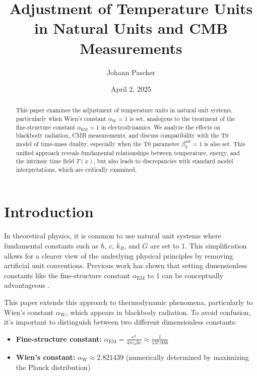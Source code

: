 \documentclass[12pt,a4paper]{article}
\newcommand{\Tfield}{T(x)}
\newcommand{\betaT}{\beta_{\text{T}}}
\newcommand{\alphaEM}{\alpha_{\text{EM}}}
\newcommand{\alphaW}{\alpha_{\text{W}}}
\begin{document}
	
	\title{Adjustment of Temperature Units in Natural Units and CMB Measurements}
	\author{Johann Pascher}
	\date{April 2, 2025}
	
	\maketitle
	
	\begin{abstract}
		This paper examines the adjustment of temperature units in natural unit systems, particularly when Wien's constant \(\alphaW = 1\) is set, analogous to the treatment of the fine-structure constant \(\alphaEM = 1\) in electrodynamics. We analyze the effects on blackbody radiation, CMB measurements, and discuss compatibility with the T0 model of time-mass duality, especially when the T0 parameter \(\betaT^{\text{nat}} = 1\) is also set. This unified approach reveals fundamental relationships between temperature, energy, and the intrinsic time field \(\Tfield\), but also leads to discrepancies with standard model interpretations, which are critically examined.
	\end{abstract}
	
	\tableofcontents
	\newpage
	
	\section{Introduction}
	\label{sec:introduction}
	
	In theoretical physics, it is common to use natural unit systems where fundamental constants such as \(\hbar\), \(c\), \(k_B\), and \(G\) are set to 1. This simplification allows for a clearer view of the underlying physical principles by removing artificial unit conventions. Previous work has shown that setting dimensionless constants like the fine-structure constant \(\alphaEM\) to 1 can be conceptually advantageous \cite{pascher_alpha_2025}.
	
	This paper extends this approach to thermodynamic phenomena, particularly to Wien's constant \(\alphaW\), which appears in blackbody radiation. To avoid confusion, it's important to distinguish between two different dimensionless constants:
	
	\begin{tcolorbox}[colback=blue!5!white,colframe=blue!75!black,title=Important dimensionless constants]
		\begin{itemize}
			\item \textbf{Fine-structure constant:} \(\alphaEM = \frac{e^2}{4\pi\varepsilon_0 \hbar c} \approx \frac{1}{137.036}\)
			\item \textbf{Wien's constant:} \(\alphaW \approx 2.821439\) (numerically determined by maximizing the Planck distribution)
		\end{itemize}
	\end{tcolorbox}
	
\end{document}
